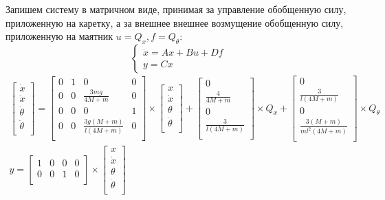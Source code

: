 Запишем систему в матричном виде, принимая за управление обобщенную силу, приложенную на каретку, а за внешнее 
внешнее возмущение обобщенную силу, приложенную на маятник $u = Q_x, f = Q_{\theta}$:
\begin{equation}
    \begin{cases}
        \dot{x} = Ax + Bu + Df \\ 
        y = Cx
    \end{cases}
    \label{eq:linear_model}
\end{equation}
\begin{equation}
    \begin{array}{cc}
        \begin{bmatrix}
        \dot{x} \\
        \ddot{x} \\
        \dot{\theta} \\
        \ddot{\theta} \\
    \end{bmatrix} = \begin{bmatrix}
        0 & 1 & 0 & 0 \\
        0 & 0 & \frac{3mg}{4M + m} & 0 \\
        0 & 0 & 0 & 1 \\
        0 & 0 & \frac{3g(M + m)}{l(4M + m)} & 0 \\
    \end{bmatrix} \times \begin{bmatrix}
        x \\
        \dot{x} \\
        \theta \\
        \dot{\theta} \\
    \end{bmatrix} + \begin{bmatrix}
        0 \\
        \frac{4}{4M + m} \\
        0 \\
        \frac{3}{l(4M + m)} \\
    \end{bmatrix} \times Q_x + \begin{bmatrix}
        0 \\
        \frac{3}{l(4M + m)} \\
        0 \\
        \frac{3(M + m)}{ml^2(4M + m)} \\ 
    \end{bmatrix} \times Q_{\theta}  \\[4em]
    y = \begin{bmatrix}
        1 & 0 & 0 & 0 \\
        0 & 0 & 1 & 0 \\ 
    \end{bmatrix} \times \begin{bmatrix}
        x \\
        \dot{x} \\
        \theta \\
        \dot{\theta} \\
    \end{bmatrix}
    \end{array}
\end{equation}

